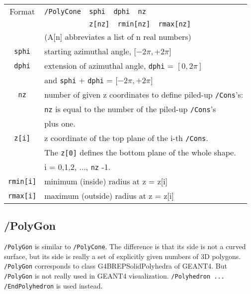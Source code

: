 \begin{tabular}{|c|l|}
\hline%
Format & \verb+/PolyCone  sphi  dphi  nz           + \\
       & \verb+           z[nz]  rmin[nz]  rmax[nz]+ \\
       & (A[n] abbreviates a list of n real numbers) \\
\hline%
\verb+sphi+  & starting azimuthal angle, $[-2\pi, +2\pi$] \\
\hline%
\verb+dphi+  &  extension of azimuthal angle, \verb+dphi+ = $[0, 2\pi]$\\
             &  and \verb+sphi+ + \verb+dphi+ = $[-2\pi, +2\pi$] \\
\hline%
\verb+nz+ & number of given z coordinates to define piled-up
            \verb+/Cons+'s:\\
          & \verb+nz+ is equal to the number of the piled-up
	    \verb+/Cons+'s\\
	  & plus one.\\
\hline%
\verb+z[i]+  & z coordinate of the top plane of the i-th \verb+/Cons+.\\  
             & The \verb+z[0]+ defines the bottom plane of the whole shape. \\
             & i = 0,1,2, ..., \verb+nz+ -1.\\
\hline%
\verb+rmin[i]+  & minimum (inside)  radius at z = z[i] \\
\hline%
\verb+rmax[i]+  & maximum (outside) radius at z = z[i] \\
\hline%
\end{tabular}


\subsection{/PolyGon}  
\verb+/PolyGon+ is similar to \verb+/PolyCone+.
The difference is that its side is not a curved surface, but 
its side is really a set of explicitly given numbers of 3D polygons. 
\verb+/PolyGon+ corresponds to class G4BREPSolidPolyhedra of GEANT4.
But \verb+/PolyGon+ is not really used in GEANT4 visualization.   
\verb+/Polyhedron ... /EndPolyhedron+ is used instead.   
\vspace{.20in}

